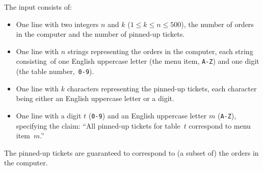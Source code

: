 
    The input consists of:
    \begin{itemize}
        \item One line with two integers $n$ and $k$ ($1 \le k \le n \le 500$), the number of orders in the computer and the number of pinned-up tickets.
        \item One line with $n$ strings representing the orders in the computer,
            each string consisting~of one English uppercase letter (the menu item, \texttt{A-Z}) %
            and one digit (the table number,~\texttt{0-9}).
        \item One line with $k$ characters representing the pinned-up tickets, each character being either an English uppercase letter or a digit.
        \item One line with a digit $t$ (\texttt{0-9}) and an English uppercase letter $m$ (\texttt{A-Z}), specifying the claim:
            ``All pinned-up tickets for table~$t$ correspond to menu item~$m$.''
    \end{itemize}

    The pinned-up tickets are guaranteed to correspond to (a subset of) the orders in the computer.
